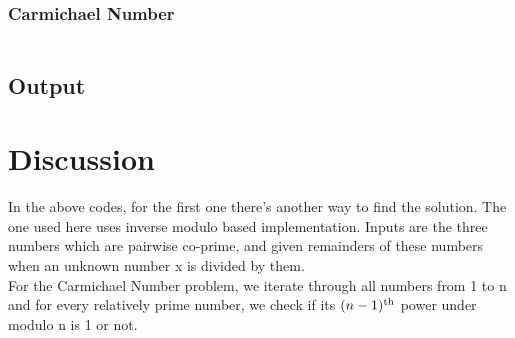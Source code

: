 \documentclass[12pt]{article}
\begin{document}
\subsubsection{Carmichael Number}
\inputminted[breaklines,linenos]{python3}{codes/carma.py}


\vspace{20mm}
\subsection{Output}


\section{Discussion}
In the above codes, for the first one there's another way to find the solution. The one used here uses inverse modulo based implementation. Inputs are the three numbers which are pairwise co-prime, and given remainders of these numbers when an unknown number x is divided by them. \cite{chineseCar}\\
For the Carmichael Number problem, we iterate through all numbers from 1 to n and for every relatively prime number, we check if its $(n-1)\textsuperscript{th}$ power under modulo n is 1 or not. \cite{chineseCar}



\end{document}
